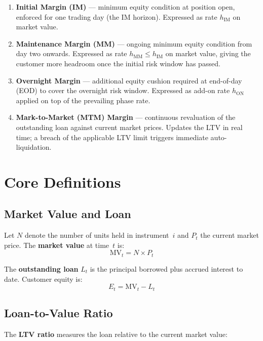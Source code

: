 \documentclass[9pt, a4paper]{extarticle}
\begin{document}
\begin{enumerate}[leftmargin=2em]
    \item \textbf{Initial Margin (IM)} — minimum equity condition at position open,
          enforced for one trading day (the IM horizon). Expressed as rate $h_{\mathrm{IM}}$
          on market value.
    \item \textbf{Maintenance Margin (MM)} — ongoing minimum equity condition from
          day two onwards. Expressed as rate $h_{\mathrm{MM}} \leq h_{\mathrm{IM}}$ on
          market value, giving the customer more headroom once the initial risk window
          has passed.
    \item \textbf{Overnight Margin} — additional equity cushion required at end-of-day
          (EOD) to cover the overnight risk window. Expressed as add-on rate
          $h_{\mathrm{ON}}$ applied on top of the prevailing phase rate.
    \item \textbf{Mark-to-Market (MTM) Margin} — continuous revaluation of the
          outstanding loan against current market prices. Updates the LTV in real time;
          a breach of the applicable LTV limit triggers immediate auto-liquidation.
\end{enumerate}

\section{Core Definitions}
\label{sec:definitions}

\subsection{Market Value and Loan}

Let $N$ denote the number of units held in instrument~$i$ and $P_t$ the current
market price. The \textbf{market value} at time~$t$ is:
\[
    \mathrm{MV}_t = N \times P_t
\]

The \textbf{outstanding loan} $L_t$ is the principal borrowed plus accrued interest
to date. Customer equity is:
\[
    E_t = \mathrm{MV}_t - L_t
\]

\subsection{Loan-to-Value Ratio}

The \textbf{LTV ratio} measures the loan relative to the current market value:
\end{document}
